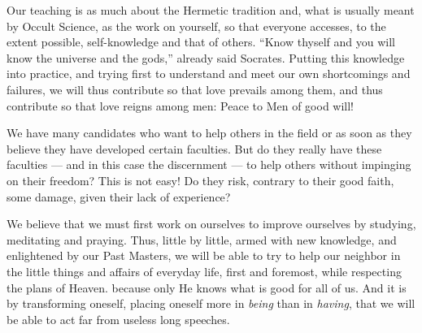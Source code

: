 
Our teaching is as much about the Hermetic tradition and, what is usually meant by Occult
Science, as the work on yourself, so that everyone accesses, to the extent possible, self-knowledge and that of others. ``Know thyself and you will know the universe and the gods,''
already said Socrates. Putting this knowledge into practice, and trying first to understand
and meet our own shortcomings and failures, we will thus contribute so that love prevails
among them, and thus contribute so that love reigns among men: Peace to Men of good will!


We have many candidates who want to help others in the field or as soon as they believe
they have developed certain faculties. But do they really have these faculties --- and in this
case the discernment --- to help others without impinging on their freedom? This is not
easy! Do they risk, contrary to their good faith, some damage, given their lack of
experience?

We believe that we must first work on ourselves to improve ourselves by studying, meditating and praying. Thus, little by little, armed with new knowledge, and enlightened by our Past Masters, we will be able to try to help our neighbor in the little things and affairs of everyday life, first and foremost, while respecting the plans of Heaven. because only He knows what is good for all of us. And it is by transforming oneself, placing oneself more in \textit{being} than in \textit{having}, that we will be able to act far from useless long speeches.